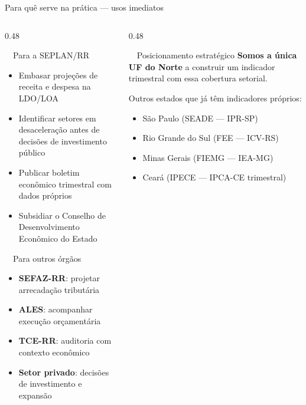 \documentclass[aspectratio=169, 11pt]{beamer}
\begin{document}
\begin{frame}{Para quê serve na prática — usos imediatos}

  \begin{columns}[T]
    \begin{column}{0.48\textwidth}

      \begin{block}{\faBuilding\ \ Para a SEPLAN/RR}
        \begin{itemize}
          \item Embasar projeções de receita e despesa na LDO/LOA
          \item Identificar setores em desaceleração antes de decisões
                de investimento público
          \item Publicar boletim econômico trimestral com dados próprios
          \item Subsidiar o Conselho de Desenvolvimento Econômico do Estado
        \end{itemize}
      \end{block}

      \vspace{0.25cm}

      \begin{block}{\faGavel\ \ Para outros órgãos}
        \begin{itemize}
          \item \textbf{SEFAZ-RR}: projetar arrecadação tributária
          \item \textbf{ALES}: acompanhar execução orçamentária
          \item \textbf{TCE-RR}: auditoria com contexto econômico
          \item \textbf{Setor privado}: decisões de investimento e expansão
        \end{itemize}
      \end{block}
    \end{column}

    \begin{column}{0.48\textwidth}
      \begin{alertblock}{\faGlobe\ \ Posicionamento estratégico}
        \textbf{Somos a única UF do Norte} a construir um indicador
        trimestral com essa cobertura setorial.

        \vspace{0.3cm}
        Outros estados que já têm indicadores próprios:
        \begin{itemize}
          \item São Paulo (SEADE — IPR-SP)
          \item Rio Grande do Sul (FEE — ICV-RS)
          \item Minas Gerais (FIEMG — IEA-MG)
          \item Ceará (IPECE — IPCA-CE trimestral)
        \end{itemize}


\end{alertblock}
\end{column}
\end{columns}
\end{frame}
\end{document}
